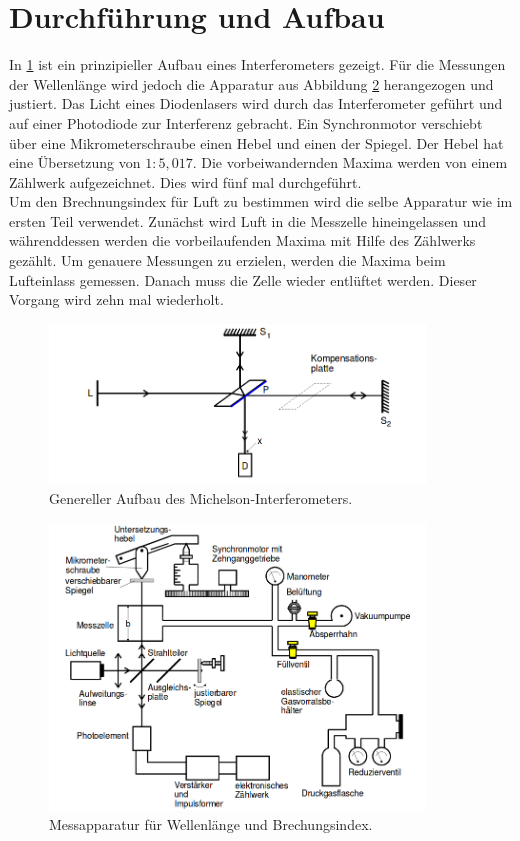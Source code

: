\section{Durchführung und Aufbau}
\label{sec:Aufbau}
In \ref{fig:λ} ist ein prinzipieller Aufbau eines Interferometers gezeigt.
Für die Messungen der Wellenlänge wird jedoch die Apparatur aus Abbildung
\ref{fig:n} herangezogen und justiert.
Das Licht eines Diodenlasers wird durch das Interferometer geführt
und auf einer Photodiode zur Interferenz gebracht.
Ein Synchronmotor verschiebt über eine Mikrometerschraube einen Hebel und einen der Spiegel.
Der Hebel hat eine Übersetzung von $1:5,017$.
Die vorbeiwandernden Maxima werden von einem Zählwerk aufgezeichnet.
Dies wird fünf mal durchgeführt.
\\
Um den Brechnungsindex für Luft zu bestimmen wird die selbe Apparatur wie im
ersten Teil verwendet.
Zunächst wird Luft in die Messzelle hineingelassen und währenddessen werden die
vorbeilaufenden Maxima mit Hilfe des Zählwerks gezählt.
Um genauere Messungen zu erzielen, werden die Maxima beim Lufteinlass gemessen.
Danach muss die Zelle wieder entlüftet werden. Dieser Vorgang wird zehn mal
wiederholt.

\begin{figure}
  \centering
  \includegraphics[width=10cm]{content/michelson_inter.png}
  \caption{Genereller Aufbau des Michelson-Interferometers\cite{Anleitung}.}
  \label{fig:λ}
\end{figure}

\begin{figure}
  \centering
  \includegraphics[width=10cm]{content/brechungsindex.png}
  \caption{Messapparatur für Wellenlänge und Brechungsindex\cite{Anleitung}.}
  \label{fig:n}
\end{figure}

